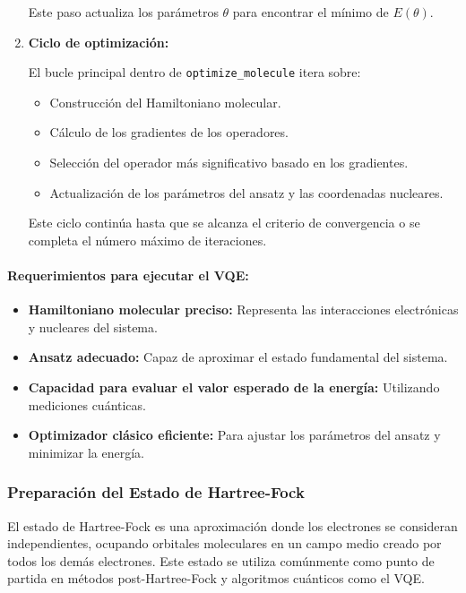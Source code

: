 \begin{enumerate}
    Este paso actualiza los parámetros \( \theta \) para encontrar el mínimo de \( E(\theta) \).
    
    \item \textbf{Ciclo de optimización:}
    
    El bucle principal dentro de \texttt{optimize\_molecule} itera sobre:
    \begin{itemize}
        \item Construcción del Hamiltoniano molecular.
        \item Cálculo de los gradientes de los operadores.
        \item Selección del operador más significativo basado en los gradientes.
        \item Actualización de los parámetros del ansatz y las coordenadas nucleares.
    \end{itemize}
    
    Este ciclo continúa hasta que se alcanza el criterio de convergencia o se completa el número máximo de iteraciones.
\end{enumerate}

\paragraph{Requerimientos para ejecutar el VQE:}

\begin{itemize}
    \item \textbf{Hamiltoniano molecular preciso:} Representa las interacciones electrónicas y nucleares del sistema.
    \item \textbf{Ansatz adecuado:} Capaz de aproximar el estado fundamental del sistema.
    \item \textbf{Capacidad para evaluar el valor esperado de la energía:} Utilizando mediciones cuánticas.
    \item \textbf{Optimizador clásico eficiente:} Para ajustar los parámetros del ansatz y minimizar la energía.
\end{itemize}

\subsubsection{Preparación del Estado de Hartree-Fock}

El estado de Hartree-Fock es una aproximación donde los electrones se consideran independientes, ocupando orbitales moleculares en un campo medio creado por todos los demás electrones. Este estado se utiliza comúnmente como punto de partida en métodos post-Hartree-Fock y algoritmos cuánticos como el VQE.

